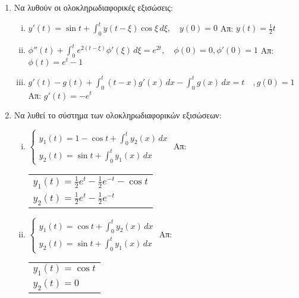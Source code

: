 





\pagestyle{empty}



\begin{center}
\end{center}

\vspace{\baselineskip}

\begin{enumerate}
\item Να λυθούν οι ολοκληρωδιαφορικές εξισώσεις:
\begin{enumerate}[i)]

\item $y'(t)=\sin t+\int_{0}^{t}y(t-\xi)\cos\xi\, d\xi,\quad y(0)=0$ \hfill Απ: $y(t)=\frac{1}{2}t$
\item $\phi''(t)+\int_{0}^{t}e^{2(t-\xi)}\phi'(\xi)\,d\xi=e^{2t},\quad \phi(0)=0, \phi'(0)=1$ \hfill Απ: $\phi(t)=e^t-1$
\item $g'(t)-g(t)+\int_{0}^{t}(t-x)g'(x)\,dx - \int_{0}^{t}g(x)\,dx = t \quad, g(0)=1$\hfill Απ: $g'(t)=-e^t$

\end{enumerate}

\item Να λυθεί το σύστημα των ολοκληρωδιαφορικών εξισώσεων:

\begin{enumerate}[i)]

\item $\begin{cases}
y_1(t)=1-\cos t+\int_{0}^{t}y_2(x)\,dx \\
y_2(t)=\sin t+\int_{0}^{t}y_1(x)\,dx
\end{cases}$ \hfill Απ: \begin{tabular}[t]{l}$y_1(t)=\frac{1}{2}e^t-\frac{1}{2}e^{-t}-\cos t$ \\
$y_2(t)=\frac{1}{2}e^t-\frac{1}{2}e^{-t}$
\end{tabular}

\vspace{\baselineskip}

\item $\begin{cases}
y_1(t)=\cos t +\int_{0}^{t}y_2(x)\,dx \\
y_2(t)=\sin t +\int_{0}^{t}y_1(x)\,dx
\end{cases}$ \hfill Απ: \begin{tabular}[t]{l}$y_1(t)=\cos t$ \\
$y_2(t)=0$
\end{tabular}


\end{enumerate}
\end{enumerate}
